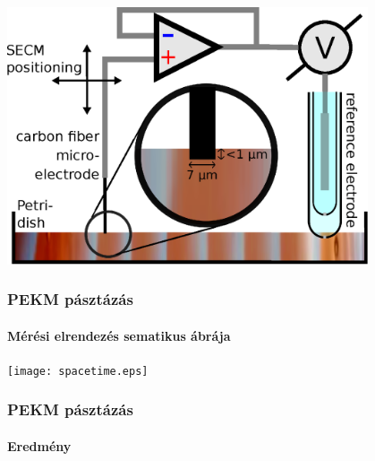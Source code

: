 \documentclass{beamer}
\begin{document}
\begin{frame}
	\centering
	\includegraphics[width=0.8\textwidth]{setup.eps}
	\frametitle{PEKM pásztázás}
	\framesubtitle{Mérési elrendezés sematikus ábrája}
\end{frame}

\begin{frame}
	\centering
	\texttt{[image: spacetime.eps]}
	\frametitle{PEKM pásztázás}
	\framesubtitle{Eredmény}
\end{frame}
\end{document}
